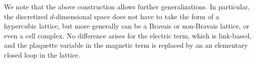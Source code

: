We note that the above construction allows further generalizations.
In particular, the discretized $d$-dimensional space does not have to take the form of a hypercubic lattice, but more generally can be a Bravais or non-Bravais lattice, or even a cell complex.
No difference arises for the electric term, which is link-based, and the plaquette variable in the magnetic term is replaced by an an elementary closed loop in the lattice.






